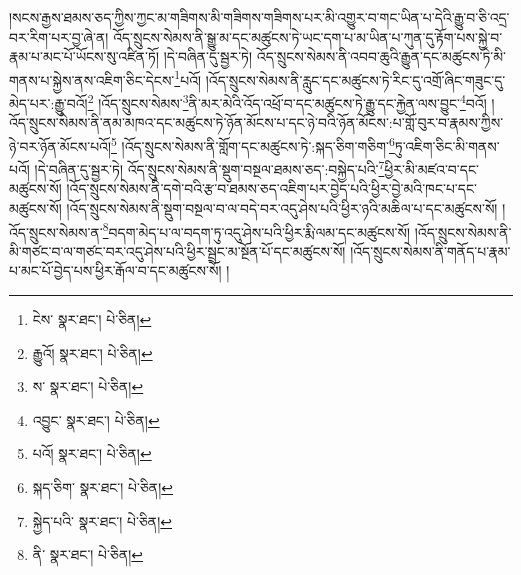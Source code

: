 །སངས་རྒྱས་ཐམས་ཅད་ཀྱིས་ཀྱང་མ་གཟིགས་མི་གཟིགས་གཟིགས་པར་མི་འགྱུར་བ་གང་ཡིན་པ་དེའི་རྒྱུ་བ་ཅི་འདྲ་བར་རིག་པར་བྱ་ཞེ་ན། འོད་སྲུངས་སེམས་ནི་སྒྱུ་མ་དང་མཚུངས་ཏེ་ཡང་དག་པ་མ་ཡིན་པ་ཀུན་དུ་རྟོག་པས་སྐྱེ་བ་རྣམ་པ་མང་པོ་ཡོངས་སུ་འཛིན་ཏོ། །དེ་བཞིན་དུ་སྦྱར་ཏེ། འོད་སྲུངས་སེམས་ནི་འབབ་ཆུའི་རྒྱུན་དང་མཚུངས་ཏེ་མི་གནས་པ་སྐྱེས་ནས་འཇིག་ཅིང་དེངས་\footnote{ངེས་  སྣར་ཐང་།  པེ་ཅིན། }པའོ། །འོད་སྲུངས་སེམས་ནི་རླུང་དང་མཚུངས་ཏེ་རིང་དུ་འགྲོ་ཞིང་གཟུང་དུ་མེད་པར་:རྒྱུ་བའོ།\footnote{རྒྱུའོ།  སྣར་ཐང་།  པེ་ཅིན། } །འོད་སྲུངས་སེམས་\footnote{ས་  སྣར་ཐང་།  པེ་ཅིན། }ནི་མར་མེའི་འོད་འཕྲོ་བ་དང་མཚུངས་ཏེ་རྒྱུ་དང་རྐྱེན་ལས་བྱུང་\footnote{འབྱུང་  སྣར་ཐང་།  པེ་ཅིན། }བའོ། །འོད་སྲུངས་སེམས་ནི་ནམ་མཁའ་དང་མཚུངས་ཏེ་ཉོན་མོངས་པ་དང་ཉེ་བའི་ཉོན་མོངས་:པ་གློ་བུར་བ་རྣམས་ཀྱིས་ཉེ་བར་ཉོན་མོངས་པའོ།\footnote{པའོ།  སྣར་ཐང་།  པེ་ཅིན། } །འོད་སྲུངས་སེམས་ནི་གློག་དང་མཚུངས་ཏེ་:སྐད་ཅིག་གཅིག་\footnote{སྐད་ཅིག་  སྣར་ཐང་།  པེ་ཅིན། }ཏུ་འཇིག་ཅིང་མི་གནས་པའོ། །དེ་བཞིན་དུ་སྦྱར་ཏེ། འོད་སྲུངས་སེམས་ནི་སྡུག་བསྔལ་ཐམས་ཅད་:བསྐྱེད་པའི་\footnote{སྐྱེད་པའི་  སྣར་ཐང་།  པེ་ཅིན། }ཕྱིར་མི་མཛའ་བ་དང་མཚུངས་སོ། །འོད་སྲུངས་སེམས་ནི་དགེ་བའི་རྩ་བ་ཐམས་ཅད་འཇིག་པར་བྱེད་པའི་ཕྱིར་བྱེ་མའི་ཁང་པ་དང་མཚུངས་སོ། །འོད་སྲུངས་སེམས་ནི་སྡུག་བསྔལ་བ་ལ་བདེ་བར་འདུ་ཤེས་པའི་ཕྱིར་ཉའི་མཆིལ་པ་དང་མཚུངས་སོ། །འོད་སྲུངས་སེམས་ན་\footnote{ནི་  སྣར་ཐང་།  པེ་ཅིན། }བདག་མེད་པ་ལ་བདག་ཏུ་འདུ་ཤེས་པའི་ཕྱིར་རྨི་ལམ་དང་མཚུངས་སོ། །འོད་སྲུངས་སེམས་ནི་མི་གཙང་བ་ལ་གཙང་བར་འདུ་ཤེས་པའི་ཕྱིར་སྦྲང་མ་སྔོན་པོ་དང་མཚུངས་སོ། །འོད་སྲུངས་སེམས་ནི་གནོད་པ་རྣམ་པ་མང་པོ་བྱེད་པས་ཕྱིར་རྒོལ་བ་དང་མཚུངས་སོ། །
